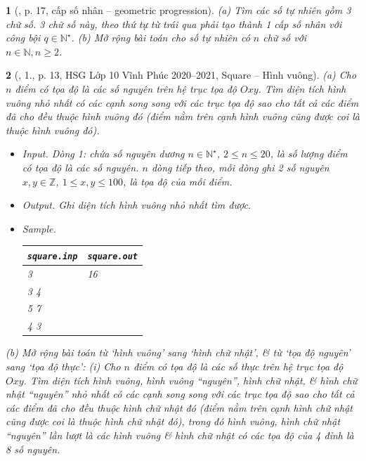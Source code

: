 \documentclass{article}
\newtheorem{baitoan}{}
\begin{document}
\begin{baitoan}[\cite{Huy_sang_tao_thuat_toan_lap_trinh_tap_1}, p. 17, cấp số nhân -- geometric progression]
	(a) Tìm các số tự nhiên gồm 3 chữ số. 3 chữ số này, theo thứ tự từ trái qua phải tạo thành 1 cấp số nhân với công bội $q\in\mathbb{N}^\star$. (b) Mở rộng bài toán cho số tự nhiên có $n$ chữ số với $n\in\mathbb{N},n\ge2$.
\end{baitoan}

\begin{baitoan}[\cite{Trung_HSG_THPT_Tin}, 1., p. 13, HSG Lớp 10 Vĩnh Phúc 2020--2021, Square -- Hình vuông]
	(a) Cho $n$ điểm có tọa độ là các số nguyên trên hệ trục tọa độ $Oxy$. Tìm diện tích hình vuông nhỏ nhất có các cạnh song song với các trục tọa độ sao cho tất cả các điểm đã cho đều thuộc hình vuông đó (điểm nằm trên cạnh hình vuông cũng được coi là thuộc hình vuông đó).
	\begin{itemize}
		\item {\sf Input.} Dòng 1: chứa số nguyên dương $n\in\mathbb{N}^\star$, $2\le n\le20$, là số lượng điểm có tọa độ là các số nguyên. $n$ dòng tiếp theo, mỗi dòng ghi 2 số nguyên $x,y\in\mathbb{Z}$, $1\le x,y\le100$, là tọa độ của mỗi điểm.
		\item {\sf Output.} Ghi diện tích hình vuông nhỏ nhất tìm được.
		\item {\sf Sample.}
		\begin{table}[H]
			\centering
			\begin{tabular}{|l|l|}
				\hline
				{\tt square.inp} & {\tt square.out} \\
				\hline
				3 & 16 \\
				3 4 &  \\
				5 7 &  \\
				4 3 &  \\
				\hline
			\end{tabular}
		\end{table}
	\end{itemize}
	(b) Mở rộng bài toán từ `hình vuông' sang `hình chữ nhật', \& từ `tọa độ nguyên' sang `tọa độ thực': (i) Cho $n$ điểm có tọa độ là các số thực trên hệ trục tọa độ $Oxy$. Tìm diện tích hình vuông, hình vuông ``nguyên'', hình chữ nhật, \& hình chữ nhật ``nguyên'' nhỏ nhất có các cạnh song song với các trục tọa độ sao cho tất cả các điểm đã cho đều thuộc hình chữ nhật đó (điểm nằm trên cạnh hình chữ nhật cũng được coi là thuộc hình chữ nhật đó), trong đó {\rm hình vuông, hình chữ nhật ``nguyên''} lần lượt là các hình vuông \& hình chữ nhật có các tọa độ của 4 đỉnh là 8 số nguyên.
\end{baitoan}
\end{document}
